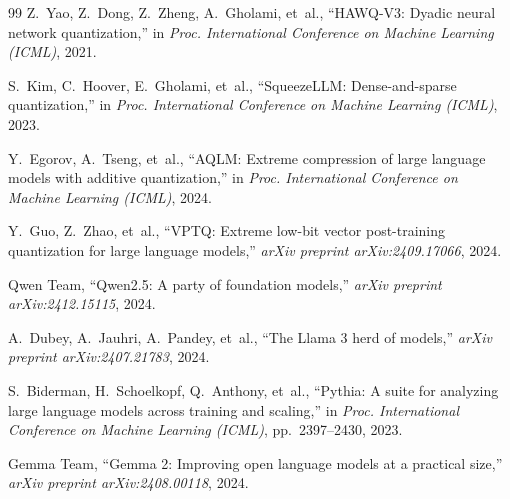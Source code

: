 \documentclass[12pt,a4paper,oneside]{report}
\begin{document}
\begin{thebibliography}{99}
    Z.~Yao, Z.~Dong, Z.~Zheng, A.~Gholami, et~al.,
    ``HAWQ-V3: Dyadic neural network quantization,''
    in \textit{Proc. International Conference on Machine Learning (ICML)}, 2021.

    S.~Kim, C.~Hoover, E.~Gholami, et~al.,
    ``SqueezeLLM: Dense-and-sparse quantization,''
    in \textit{Proc. International Conference on Machine Learning (ICML)}, 2023.

    Y.~Egorov, A.~Tseng, et~al.,
    ``AQLM: Extreme compression of large language models with additive quantization,''
    in \textit{Proc. International Conference on Machine Learning (ICML)}, 2024.

    Y.~Guo, Z.~Zhao, et~al.,
    ``VPTQ: Extreme low-bit vector post-training quantization for large language models,''
    \textit{arXiv preprint arXiv:2409.17066}, 2024.

    Qwen Team,
    ``Qwen2.5: A party of foundation models,''
    \textit{arXiv preprint arXiv:2412.15115}, 2024.
    
    A.~Dubey, A.~Jauhri, A.~Pandey, et~al.,
    ``The Llama 3 herd of models,''
    \textit{arXiv preprint arXiv:2407.21783}, 2024.

    S.~Biderman, H.~Schoelkopf, Q.~Anthony, et~al.,
    ``Pythia: A suite for analyzing large language models across training and scaling,''
    in \textit{Proc. International Conference on Machine Learning (ICML)}, pp.~2397--2430, 2023.

    Gemma Team,
    ``Gemma 2: Improving open language models at a practical size,''
    \textit{arXiv preprint arXiv:2408.00118}, 2024.

    \end{thebibliography}

    
\end{document}
